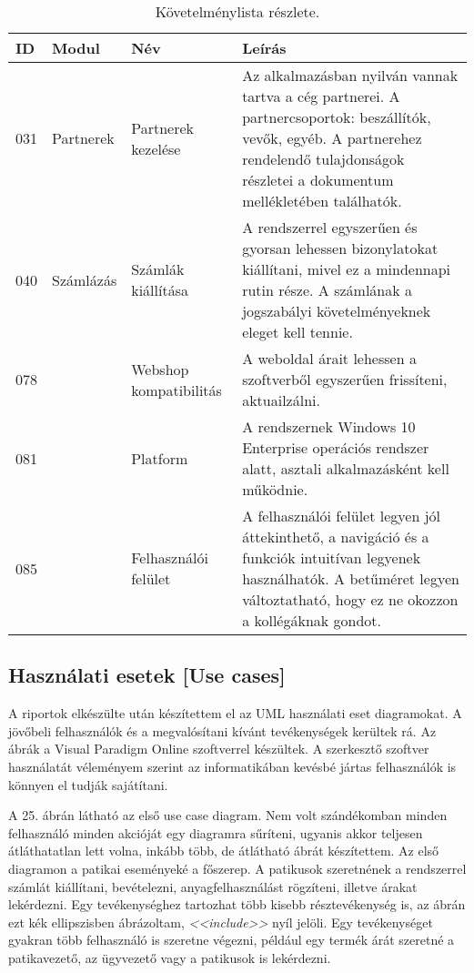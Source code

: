 \documentclass[12pt]{article}
\begin{document}
\begin{table}[h!]
\centering
\begin{tabular}{ |p{0.5cm}|p{2.2cm}|p{2.2cm}|p{7cm}| } 
\hline
 \textbf{ID} & \textbf{Modul} &\textbf{Név} &\textbf{ Leírás} \\
\hline
031 & Partnerek& Partnerek kezelése& Az alkalmazásban nyilván vannak tartva a cég partnerei. A partnercsoportok: beszállítók, vevők, egyéb. A partnerehez rendelendő tulajdonságok részletei a dokumentum mellékletében találhatók. \\
\hline
040 & Számlázás& Számlák kiállítása& A rendszerrel egyszerűen és gyorsan lehessen bizonylatokat kiállítani, mivel ez a mindennapi rutin része. A számlának a jogszabályi követelményeknek eleget kell tennie.\\
\hline
078 & & Webshop kompatibilitás& A weboldal árait lehessen a szoftverből egyszerűen frissíteni, aktuailzálni. \\
\hline
081 && Platform & A rendszernek Windows 10 Enterprise operációs rendszer alatt, asztali alkalmazásként kell működnie. \\

\hline
085 & &Felhasználói felület & A felhasználói felület legyen jól áttekinthető, a navigáció és a funkciók intuitívan legyenek használhatók. A betűméret legyen változtatható, hogy ez ne okozzon a kollégáknak gondot. \\

\hline
\end{tabular}
\caption{Követelménylista részlete.}
\end{table}

\subsection{ Használati esetek [Use cases]}

A riportok elkészülte után készítettem el az UML használati eset diagramokat. A jövőbeli felhasználók és a megvalósítani kívánt tevékenységek kerültek rá. Az ábrák a Visual Paradigm Online szoftverrel készültek. A szerkesztő szoftver használatát véleményem szerint az informatikában kevésbé jártas felhasználók is könnyen el tudják sajátítani.

 A 25. ábrán látható az első use case diagram. Nem volt szándékomban minden felhasználó minden akcióját egy diagramra sűríteni, ugyanis akkor teljesen átláthatatlan lett volna, inkább több, de átlátható ábrát készítettem. Az első diagramon a patikai eseményeké a főszerep. A patikusok szeretnének a rendszerrel számlát kiállítani, bevételezni, anyagfelhasználást rögzíteni, illetve árakat lekérdezni. Egy tevékenységhez tartozhat több kisebb résztevékenység is, az ábrán ezt kék ellipszisben ábrázoltam, \textit{<<include>>} nyíl jelöli. Egy tevékenységet gyakran több felhasználó is szeretne végezni, például egy termék árát szeretné a patikavezető, az ügyvezető vagy a patikusok is lekérdezni.
\end{document}
